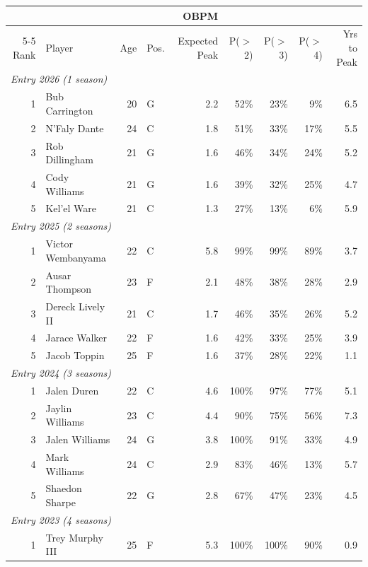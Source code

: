 \begin{table}[htbp]
  \centering\small
  \begin{tabular}{rlrlrrrrr}
    \toprule
     & & & & OBPM & & & & \\
    \cmidrule(lr){5-5}
    Rank & Player & Age & Pos. & Expected Peak & P($>$2) & P($>$3) & P($>$4) & Yrs to Peak \\
    \midrule
    \multicolumn{9}{l}{\textit{Entry 2026 (1 season)}} \\
    \midrule
    1 & Bub Carrington & 20 & G & 2.2 & 52\% & 23\% & 9\% & 6.5 \\
    2 & N'Faly Dante & 24 & C & 1.8 & 51\% & 33\% & 17\% & 5.5 \\
    3 & Rob Dillingham & 21 & G & 1.6 & 46\% & 34\% & 24\% & 5.2 \\
    4 & Cody Williams & 21 & G & 1.6 & 39\% & 32\% & 25\% & 4.7 \\
    5 & Kel'el Ware & 21 & C & 1.3 & 27\% & 13\% & 6\% & 5.9 \\
    \midrule[0.4pt]
    \multicolumn{9}{l}{\textit{Entry 2025 (2 seasons)}} \\
    \midrule
    1 & Victor Wembanyama & 22 & C & 5.8 & 99\% & 99\% & 89\% & 3.7 \\
    2 & Ausar Thompson & 23 & F & 2.1 & 48\% & 38\% & 28\% & 2.9 \\
    3 & Dereck Lively II & 21 & C & 1.7 & 46\% & 35\% & 26\% & 5.2 \\
    4 & Jarace Walker & 22 & F & 1.6 & 42\% & 33\% & 25\% & 3.9 \\
    5 & Jacob Toppin & 25 & F & 1.6 & 37\% & 28\% & 22\% & 1.1 \\
    \midrule[0.4pt]
    \multicolumn{9}{l}{\textit{Entry 2024 (3 seasons)}} \\
    \midrule
    1 & Jalen Duren & 22 & C & 4.6 & 100\% & 97\% & 77\% & 5.1 \\
    2 & Jaylin Williams & 23 & C & 4.4 & 90\% & 75\% & 56\% & 7.3 \\
    3 & Jalen Williams & 24 & G & 3.8 & 100\% & 91\% & 33\% & 4.9 \\
    4 & Mark Williams & 24 & C & 2.9 & 83\% & 46\% & 13\% & 5.7 \\
    5 & Shaedon Sharpe & 22 & G & 2.8 & 67\% & 47\% & 23\% & 4.5 \\
    \midrule[0.4pt]
    \multicolumn{9}{l}{\textit{Entry 2023 (4 seasons)}} \\
    \midrule
    1 & Trey Murphy III & 25 & F & 5.3 & 100\% & 100\% & 90\% & 0.9 \\

\end{tabular}
\end{table}
